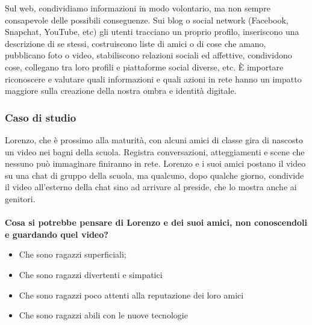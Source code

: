 \documentclass{article}
\begin{document}
		\newline
		Sul web, condividiamo informazioni in modo volontario, ma non sempre consapevole delle possibili conseguenze. Sui blog o social network (Facebook, Snapchat, YouTube, etc) gli utenti tracciano un proprio profilo, inseriscono una descrizione di se stessi, costruiscono liste di amici o di cose che amano, pubblicano foto o video, stabiliscono relazioni sociali ed affettive, condividono cose, collegano tra loro profili e piattaforme social diverse, etc. È importare riconoscere e valutare quali informazioni e quali azioni in rete hanno un impatto maggiore sulla creazione della nostra ombra e identità digitale.\\
		\subsubsection{Caso di studio}
		\label{sec:Caso1}
		Lorenzo, che è prossimo alla maturità, con alcuni amici di classe gira di nascosto un video nei bagni della scuola. Registra conversazioni, atteggiamenti e scene che nessuno può immaginare finiranno in rete. Lorenzo e i suoi amici postano il video su una chat di gruppo della scuola, ma qualcuno, dopo qualche giorno, condivide il video all’esterno della chat sino ad arrivare al preside, che lo mostra anche ai genitori.
		\\\vspace{5mm}\\
		\textbf{Cosa si potrebbe pensare di Lorenzo e dei suoi amici, non conoscendoli e guardando quel video?}
		\begin{itemize}
			\item Che sono ragazzi superficiali;
			\item Che sono ragazzi divertenti e simpatici
			\item Che sono ragazzi poco attenti alla reputazione dei loro amici
			\item Che sono ragazzi abili con le nuove tecnologie
		\end{itemize}
\end{document}
